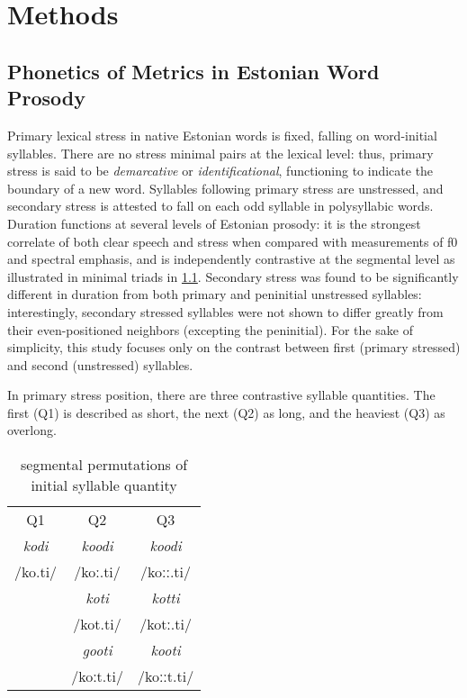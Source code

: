 \chapter{Methods}
%
\section{Phonetics of Metrics in Estonian Word Prosody}

Primary lexical stress in native Estonian words is fixed, falling on word-initial syllables. There are no stress minimal pairs at the lexical level: thus, primary stress is said to be {\it demarcative} or {\it identificational}\citep{lehiste1992}, functioning to indicate the boundary of a new word. Syllables following primary stress are unstressed, and secondary stress is attested to fall on each odd syllable in polysyllabic words. Duration functions at several levels of Estonian prosody: it is the strongest correlate of both clear speech and stress \citep{lippusAsuMari2014} when compared with measurements of f0 and spectral emphasis, and is independently contrastive at the segmental level as illustrated in minimal triads in \ref{qperm}. Secondary stress was found to be significantly different in duration from both primary and peninitial unstressed syllables: interestingly, secondary stressed syllables were not shown to differ greatly from their even-positioned neighbors (excepting the peninitial). For the sake of simplicity, this study focuses only on the contrast between first (primary stressed) and second (unstressed) syllables. 


In primary stress position, there are three contrastive syllable quantities. The first (Q1) is described as short, the next (Q2) as long, and the heaviest (Q3) as overlong. 



 \begin{table}[htb]
\centering
\begin{tabular}{ccc}
\hline
Q1 & Q2 & Q3 \\
{\it kodi	} 	& {\it koodi }	& {\it koodi }	\\  
/ko.ti/		& /koː.ti/	& /koːː.ti/	\\
\hline
		& {\it koti }	& {\it kotti}	 \\
		& /kot.ti/	& /kotː.ti/	\\
\hline
		& {\it gooti}	& {\it kooti} 	\\
		& /koːt.ti/	& /koːːt.ti/	\\
\hline
\end{tabular}
\label{qperm}
\caption{segmental permutations of initial syllable quantity}
\end{table}

